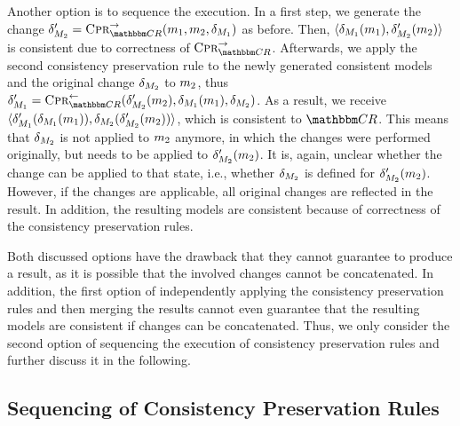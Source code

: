 Another option is to sequence the execution.
In a first step, we generate the change $\change{\metamodel{M}{2}}' = \consistencypreservationrule{\consistencyrelationset{CR}}^{\rightarrow}(\model{m}{1},\model{m}{2}, \change{\metamodel{M}{1}})$ as before.
Then, $\tupled{\change{\metamodel{M}{1}}(\model{m}{1}), \change{\metamodel{M}{2}}'(\model{m}{2})}$ is consistent due to correctness of $\consistencypreservationrule{\consistencyrelationset{CR}}^{\rightarrow}$.
Afterwards, we apply the second consistency preservation rule to the newly generated consistent models and the original change $\change{\metamodel{M}{2}}$ to $\model{m}{2}$, thus $\change{\metamodel{M}{1}}' = \consistencypreservationrule{\consistencyrelationset{CR}}^{\leftarrow}(\change{\metamodel{M}{2}}'(\model{m}{2}), \change{\metamodel{M}{1}}(\model{m}{1}), \change{\metamodel{M}{2}})$.
As a result, we receive $\tupled{\change{\metamodel{M}{1}}'(\change{\metamodel{M}{1}}(\model{m}{1})), \change{\metamodel{M}{2}}(\change{\metamodel{M}{2}}'(\model{m}{2}))}$, which is consistent to $\consistencyrelationset{CR}$.
This means that $\change{\metamodel{M}{2}}$ is not applied to $\model{m}{2}$ anymore, in which the changes were performed originally, but needs to be applied to $\change{\metamodel{M}{2}}'(\model{m}{2})$.
It is, again, unclear whether the change can be applied to that state, i.e., whether $\change{\metamodel{M}{2}}$ is defined for $\change{\metamodel{M}{2}}'(\model{m}{2})$.
However, if the changes are applicable, all original changes are reflected in the result.
In addition, the resulting models are consistent because of correctness of the consistency preservation rules.

Both discussed options have the drawback that they cannot guarantee to produce a result, as it is possible that the involved changes cannot be concatenated.
In addition, the first option of independently applying the consistency preservation rules and then merging the results cannot even guarantee that the resulting models are consistent if changes can be concatenated.
Thus, we only consider the second option of sequencing the execution of consistency preservation rules and further discuss it in the following.


\subsection{Sequencing of Consistency Preservation Rules}
\label{chap:synchronization:combination:sequencing}

